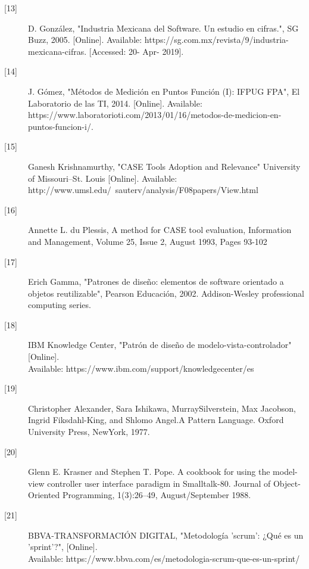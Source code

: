 \begin{description}
		\item[\hypertarget{b13}{[13]}] D. González, "Industria Mexicana del Software. Un estudio en cifras.", SG Buzz, 2005. [Online]. Available: https://sg.com.mx/revista/9/industria-mexicana-cifras. [Accessed: 20- Apr- 2019].
		
		\item[\hypertarget{b14}{[14]}] J. Gómez, "Métodos de Medición en Puntos Función (I): IFPUG FPA", El Laboratorio de las TI, 2014. [Online]. Available: https://www.laboratorioti.com/2013/01/16/metodos-de-medicion-en-puntos-funcion-i/. 
		
		\item[\hypertarget{b15}{[15]}] Ganesh Krishnamurthy, "CASE Tools 
		Adoption and Relevance" University of Missouri–St. Louis [Online]. Available: http://www.umsl.edu/~sauterv/analysis/F08papers/View.html
		
		\item[\hypertarget{b16}{[16]}] Annette L. du Plessis, A method for CASE tool evaluation, Information and Management, Volume 25, Issue 2, August 1993, Pages 93-102
		
		\item[\hypertarget{b17}{[17]}]	Erich Gamma, "Patrones de diseño: elementos de software orientado a objetos reutilizable", Pearson Educación, 2002. Addison-Wesley professional computing series.
		
		\item[\hypertarget{b18}{[18]}] IBM Knowledge Center, "Patrón de diseño de modelo-vista-controlador" [Online].\\ Available: https://www.ibm.com/support/knowledgecenter/es
		
		\item[\hypertarget{b19}{[19]}] Christopher Alexander, Sara Ishikawa, MurraySilverstein, Max Jacobson,
		Ingrid Fiksdahl-King, and Shlomo Angel.A Pattern Language. Oxford University
		Press, NewYork, 1977.
		
		\item[\hypertarget{b20}{[20]}] Glenn E. Krasner and Stephen T. Pope. A cookbook for using the model-view
		controller user interface paradigm in Smalltalk-80. Journal of Object-Oriented Programming, 1(3):26–49, August/September 1988.
		
		\item[\hypertarget{b21}{[21]}] BBVA-TRANSFORMACIÓN DIGITAL, "Metodología 'scrum': ¿Qué es un 'sprint'?", [Online].\\ Available: https://www.bbva.com/es/metodologia-scrum-que-es-un-sprint/
		

\end{description}
